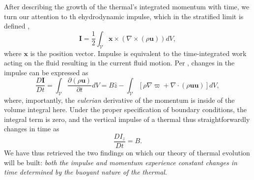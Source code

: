 \documentclass[twocolumn, amsmath, amsfonts, amssymb, trackchanges]{aastex62}
\newcommand{\Div}[1]{\ensuremath{\nabla\cdot\left( #1\right)}}
\newcommand{\grad}{\ensuremath{\nabla}}
\begin{document}
After describing the growth of the thermal's integrated momentum with time, we turn
our attention to th ehydrodynamic impulse, which in the stratified limit is defined
\citep{shivamoggi2010},
\begin{equation}
\bm{I} = \frac{1}{2}\int_{\mathcal{V}} \bm{x}\times(\grad\times(\rho\bm{u}))dV,
\end{equation}
where $\bm{x}$ is the position vector. Impulse is equivalent to the time-integrated
work acting on the fluid resulting in the current fluid motion. 
Per \citet{shivamoggi2010}, changes in the impulse can be expressed as
\begin{equation*}
\frac{D\bm{I}}{D t} = \int_{\mathcal{V}}\frac{\partial(\rho\bm{u})}{\partial t}dV
= B\hat{z} - \int_{\mathcal{V}}\left[\rho\grad\varpi + \Div{\rho\bm{u}\bm{u}}\right]dV ,
\end{equation*}
where, importantly, the \emph{eulerian} derivative of the momentum is inside of the volume
integral here. Under the proper specification of boundary conditions, 
the integral term is zero, and the vertical impulse of a thermal thus straightforwardly
changes in time as
\begin{equation}
\frac{D I_z}{D t} = B.
\label{eqn:change_in_impulse}
\end{equation}
We have thus retrieved the two findings on which our theory of thermal evolution
will be built: \emph{both the impulse and momentum experience constant changes in
time determined by the buoyant nature of the thermal}.
\end{document}
